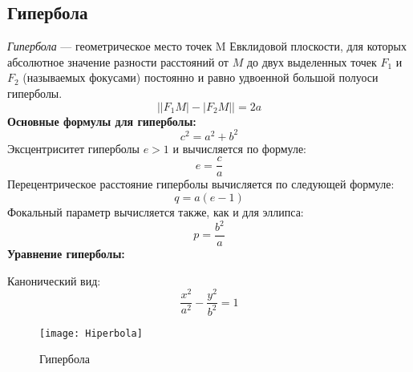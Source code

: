 \subsection{Гипербола}
 
\textsl{Гипербола} --- геометрическое место точек M Евклидовой плоскости, для которых абсолютное значение разности расстояний от $M$ до двух выделенных точек $F_1$ и $F_2$ (называемых фокусами) постоянно и равно удвоенной большой полуоси гиперболы.
\begin{equation}
\bigl||F_1M|-|F_2M|\bigr|=2a
\end{equation}
\textbf{Основные формулы для гиперболы:}
\begin{equation}
c^2=a^2+b^2
\end{equation}
Эксцентриситет гиперболы $e>1$ и вычисляется по формуле:
\begin{equation}
e=\frac{c}{a}
\end{equation}
Перецентрическое расстояние гиперболы вычисляется по следующей формуле:
\begin{equation}
q=a(e-1)
\end{equation}
Фокальный параметр вычисляется также, как и для эллипса:
\begin{equation}
p=\frac{b^2}{a}
\end{equation}
\textbf{Уравнение гиперболы:}

Канонический вид:
\begin{equation}
\frac{x^2}{a^2}-\frac{y^2}{b^2}=1
\end{equation}
\begin{figure}[h!]
\centering
\texttt{[image: Hiperbola]}
\caption{Гипербола \label{pic:the-pic}}
\end{figure}